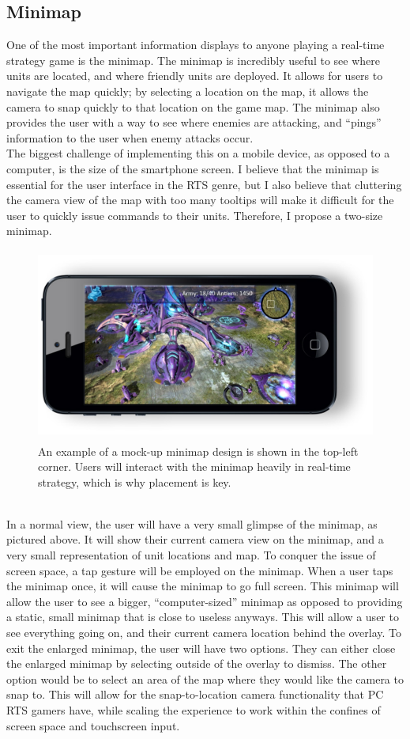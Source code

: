 \documentclass[11pt]{article}
\begin{document}
	\subsection{Minimap}
	One of the most important information displays to anyone playing a real-time strategy game is the minimap. The minimap is incredibly useful to see where units are located, and where friendly units are deployed. It allows for users to navigate the map quickly; by selecting a location on the map, it allows the camera to snap quickly to that location on the game map. The minimap also provides the user with a way to see where enemies are attacking, and ``pings'' information to the user when enemy attacks occur.\\
	\indent The biggest challenge of implementing this on a mobile device, as opposed to a computer, is the size of the smartphone screen. I believe that the minimap is essential for the user interface in the RTS genre, but I also believe that cluttering the camera view of the map with too many tooltips will make it difficult for the user to quickly issue commands to their units. Therefore, I propose a two-size minimap.
	\begin{figure}[!ht]
	\begin{center}
	\includegraphics[height = 2.5in]{minimap}
	\caption{An example of a mock-up minimap design is shown in the top-left corner. Users will interact with the minimap heavily in real-time strategy, which is why placement is key.}
	\end{center}
	\end{figure} \\
	\indent In a normal view, the user will have a very small glimpse of the minimap, as pictured above. It will show their current camera view on the minimap, and a very small representation of unit locations and map. To conquer the issue of screen space, a tap gesture will be employed on the minimap. When a user taps the minimap once, it will cause the minimap to go full screen. This minimap will allow the user to see a bigger, ``computer-sized'' minimap as opposed to providing a static, small minimap that is close to useless anyways. This will allow a user to see everything going on, and their current camera location behind the overlay. To exit the enlarged minimap, the user will have two options. They can either close the enlarged minimap by selecting outside of the overlay to dismiss. The other option would be to select an area of the map where they would like the camera to snap to. This will allow for the snap-to-location camera functionality that PC RTS gamers have, while scaling the experience to work within the confines of screen space and touchscreen input.
\end{document}

